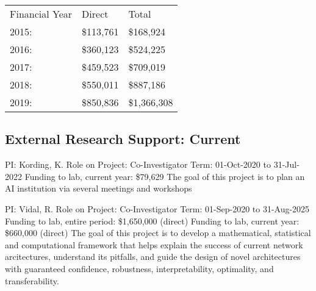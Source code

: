 \documentclass[10pt,colorlinks=true,urlcolor=blue]{moderncv}
\begin{document}
    \centering
    \begin{tabular}{p{3cm}p{2cm}p{3cm}}
    Financial Year & Direct & Total \\
    2015: & \$113,761 & \$168,924 \\
    2016: & \$360,123 & \$524,225 \\
    2017: & \$459,523 & \$709,019 \\
    2018: & \$550,011 & \$887,186 \\
    2019: & \$850,836 & \$1,366,308
    \end{tabular}
    
    \subsection{External Research Support: Current}
    
    {\newline PI: Kording, K.
    \newline Role on Project: Co-Investigator
    \newline Term: 01-Oct-2020 to 31-Jul-2022
    \newline Funding to lab, current year: \$79,629
    \newline The goal of this project is to plan an AI institution via several meetings and workshops}{}{}{}
    
    {\newline PI: Vidal, R.
    \newline Role on Project: Co-Investigator
    \newline Term: 01-Sep-2020 to 31-Aug-2025
    \newline Funding to lab, entire period: \$1,650,000 (direct)
    \newline Funding to lab, current year: \$660,000 (direct)
    \newline The goal of this project is to develop a mathematical, statistical and computational framework that helps explain the success of current network arcitectures, understand its pitfalls, and guide the
    design of novel architectures with guaranteed confidence, robustness, interpretability, optimality, and transferability.}{}{}{}
    
\end{document}
